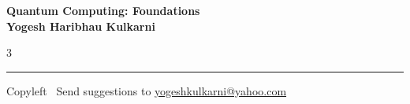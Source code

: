 \documentclass[8pt,landscape]{article}
\begin{document}
\footnotesize

\begin{center}
\Large{\textbf{Quantum Computing: Foundations\\ Yogesh Haribhau Kulkarni}}
\end{center}

\begin{multicols}{3}

\end{multicols}

\rule{\linewidth}{0.25pt}
\scriptsize
Copyleft \textcopyleft\  Send suggestions to
\href{http://www.yogeshkulkarni.com}{yogeshkulkarni@yahoo.com}
\end{document}
